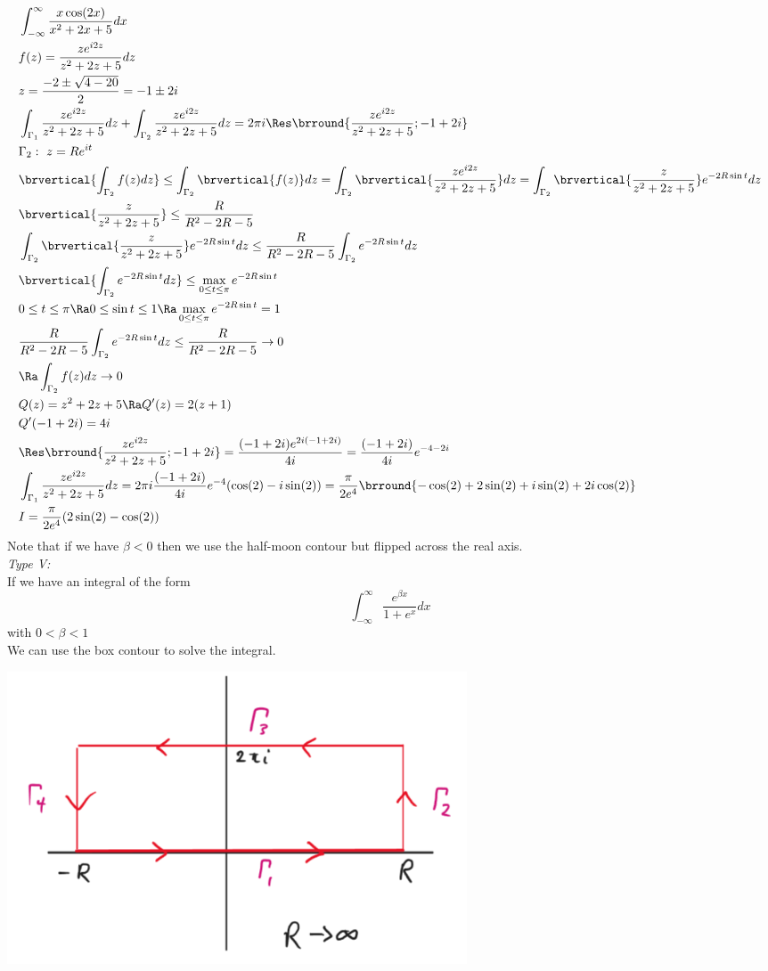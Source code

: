 \begin{align*}
    &\int_{-\infty}^\infty\frac{x\cos(2x)}{x^2+2x+5}dx\\
    &f(z)=\frac{ze^{i2z}}{z^2+2z+5}dz\\
    &z=\frac{-2\pm\sqrt{4-20}}{2}=-1\pm 2i\\
    &\int_{\Gamma_1}\frac{ze^{i2z}}{z^2+2z+5}dz+\int_{\Gamma_2}\frac{ze^{i2z}}{z^2+2z+5}dz=2\pi i\Res\brround{\frac{ze^{i2z}}{z^2+2z+5};-1+2i}\\
    &\Gamma_2:\ z=Re^{it}\\
    &\brvertical{\int_{\Gamma_2}f(z)dz}\leq\int_{\Gamma_2}\brvertical{f(z)}dz=\int_{\Gamma_2}\brvertical{\frac{ze^{i2z}}{z^2+2z+5}}dz=\int_{\Gamma_2}\brvertical{\frac{z}{z^2+2z+5}}e^{-2R\sin t}dz\\
    &\brvertical{\frac{z}{z^2+2z+5}}\leq\frac{R}{R^2-2R-5}\\
    &\int_{\Gamma_2}\brvertical{\frac{z}{z^2+2z+5}}e^{-2R\sin t}dz\leq\frac{R}{R^2-2R-5}\int_{\Gamma_2}e^{-2R\sin t}dz\\
    &\brvertical{\int_{\Gamma_2}e^{-2R\sin t}dz}\leq\max_{0\leq t\leq \pi}e^{-2R\sin t}\\
    &0\leq t\leq \pi\Ra 0\leq \sin t\leq 1\Ra \max_{0\leq t\leq \pi}e^{-2R\sin t}=1\\
    &\frac{R}{R^2-2R-5}\int_{\Gamma_2}e^{-2R\sin t}dz\leq\frac{R}{R^2-2R-5}\to 0\\
    &\Ra \int_{\Gamma_2}f(z)dz\to0\\
    &Q(z)=z^2+2z+5\Ra Q'(z)=2(z+1)\\
    &Q'(-1+2i)=4i\\
    &\Res\brround{\frac{ze^{i2z}}{z^2+2z+5};-1+2i}=\frac{(-1+2i)e^{2i(-1+2i)}}{4i}=\frac{(-1+2i)}{4i}e^{-4-2i}\\
    &\int_{\Gamma_1}\frac{ze^{i2z}}{z^2+2z+5}dz=2\pi i\frac{(-1+2i)}{4i}e^{-4}(\cos(2)-i\sin(2))=\frac{\pi}{2e^4}\brround{-\cos(2)+2\sin(2)+i\sin(2)+2i\cos(2)}\\
    &I=\frac{\pi}{2e^4}(2\sin(2)-\cos(2))
\end{align*}
Note that if we have $\beta<0$ then we use the half-moon contour but flipped across the real axis.\\
\textit{Type V:}\\
If we have an integral of the form
\[\int_{-\infty}^\infty\frac{e^{\beta x}}{1+e^x}dx\]
with $0<\beta<1$\\
We can use the box contour to solve the integral.\\
\centerline{\includegraphics[width=0.6\textwidth]{Images/ComplexAnalysisPictures/Box.png}}
